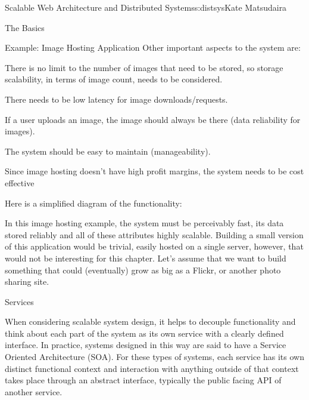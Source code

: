 \begin{aosachapter}{Scalable Web Architecture and Distributed Systems}{s:distsys}{Kate Matsudaira}
\begin{aosasect1}{The Basics}
\begin{aosasect2}{Example: Image Hosting Application}
Other important aspects to the system are:

\begin{aosaitemize}

\item There is no limit to the number of images that need to be
  stored, so storage scalability, in terms of image count, needs to be
  considered.

\item There needs to be low latency for image downloads/requests.

\item If a user uploads an image, the image should always be there
  (data reliability for images).

\item The system should be easy to maintain (manageability).

\item Since image hosting doesn't have high profit margins, the system
  needs to be cost effective

\end{aosaitemize}

Here is a simplified diagram of the functionality:


In this image hosting example, the system must be perceivably fast,
its data stored reliably and all of these attributes highly
scalable. Building a small version of this application would be
trivial, easily hosted on a single server, however, that would not be
interesting for this chapter. Let's assume that we want to build
something that could (eventually) grow as big as a Flickr, or another
photo sharing site.

\end{aosasect2}

\begin{aosasect2}{Services}

When considering scalable system design, it helps to decouple
functionality and think about each part of the system as its own
service with a clearly defined interface. In practice, systems
designed in this way are said to have a Service Oriented Architecture
(SOA). For these types of systems, each service has its own distinct
functional context and interaction with anything outside of that
context takes place through an abstract interface, typically the
public facing API of another service.


\end{aosasect2}
\end{aosasect1}
\end{aosachapter}
